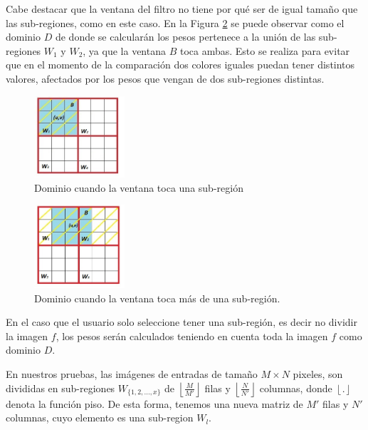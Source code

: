 

Cabe destacar que la ventana del filtro no tiene por qu\'e ser de igual
tama\~no que las sub-regiones, como en este caso. En la Figura \ref{fig:Sub-regiones} se puede observar como el dominio $D$ de donde se calcular\'an los pesos pertenece a la uni\'on de las sub-regiones $W_1$ y $W_2$, ya que la ventana $B$ toca ambas. Esto se realiza para evitar que en el momento de la comparaci\'on dos colores  iguales puedan tener distintos valores, afectados por los pesos que vengan de dos sub-regiones distintas.  


\begin{figure}
	\centering
		\includegraphics[width=0.3\textwidth]{fig/Sub-region.jpg}
	\caption{Dominio cuando la ventana toca una sub-regi\'on}
	\label{fig:Sub-region}
\end{figure}




\begin{figure}
	\centering
		\includegraphics[width=0.3\textwidth]{fig/Sub-regiones.jpg}
	\caption{Dominio cuando la ventana toca m\'as de una sub-regi\'on.}
	\label{fig:Sub-regiones}
\end{figure} En el caso que el usuario solo seleccione tener una sub-regi\'on, es decir no dividir la imagen $f$, los pesos ser\'an calculados teniendo en cuenta toda la imagen $f$ como dominio $D$. 

En nuestros pruebas, las im\'agenes de entradas de tama\~no $M \times N$ pixeles, son divididas en sub-regiones $W_{\{1,2,...,x\}}$ de $\left\lfloor\frac{M}{M'}\right\rfloor$ filas y $\left\lfloor\frac{N}{N'}\right\rfloor$ columnas, donde $\left\lfloor.\right\rfloor$ denota la funci\'on piso. De esta forma, tenemos una nueva matriz de $M'$ filas y $N'$ columnas, cuyo elemento es una sub-region $W_l$.



